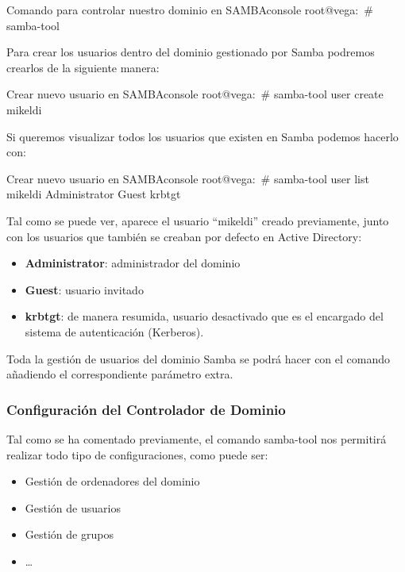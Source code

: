 \documentclass{../../../yukibook.cls/yukibook}
\begin{document}
\begin{mycode}{Comando para controlar nuestro dominio en SAMBA}{console}{}
root@vega:~# samba-tool
\end{mycode}

Para crear los usuarios dentro del dominio gestionado por Samba podremos crearlos de la siguiente manera:

\begin{mycode}{Crear nuevo usuario en SAMBA}{console}{}
root@vega:~# samba-tool user create mikeldi
\end{mycode}

Si queremos visualizar todos los usuarios que existen en Samba podemos hacerlo con:

\begin{mycode}{Crear nuevo usuario en SAMBA}{console}{}
root@vega:~# samba-tool user list
mikeldi
Administrator
Guest
krbtgt
\end{mycode}

Tal como se puede ver, aparece el usuario “mikeldi” creado previamente, junto con los usuarios que también se creaban por defecto en Active Directory:

\begin{itemize}
    \item \textbf{Administrator}: administrador del dominio
    \item \textbf{Guest}: usuario invitado
    \item \textbf{krbtgt}: de manera resumida, usuario desactivado que es el encargado del sistema de autenticación (Kerberos).
\end{itemize}


Toda la gestión de usuarios del dominio Samba se podrá hacer con el comando   añadiendo el correspondiente parámetro extra.




\subsubsection{Configuración del Controlador de Dominio}
Tal como se ha comentado previamente, el comando  samba-tool  nos permitirá realizar todo tipo de configuraciones, como puede ser:
\begin{itemize}
    \item Gestión de ordenadores del dominio
    \item Gestión de usuarios
    \item Gestión de grupos
    \item …
\end{itemize}
\end{document}
